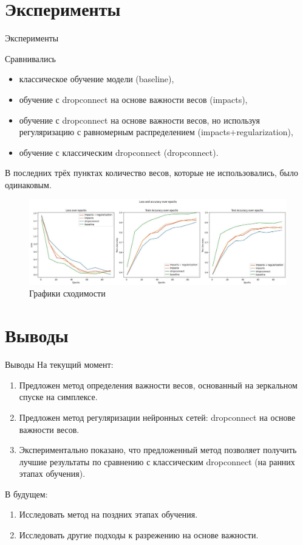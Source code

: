 \documentclass[10pt,pdf,hyperref={unicode}]{beamer}
\begin{document}
\section{Эксперименты}
\begin{frame}{Эксперименты}
\justifying

Сравнивались 
\begin{itemize}
\item классическое обучение модели (baseline), 
\item обучение с dropconnect на основе важности весов (impacts),
\item обучение с dropconnect на основе важности весов, но используя регуляризацию с равномерным распределением (impacts+regularization),
\item обучение с классическим dropconnect (dropconnect).
\end{itemize}
В последних трёх пунктах количество весов, которые не использовались, было одинаковым.

\begin{figure}[h]
\centering
\includegraphics[width=1\textwidth]{../figures/exp.png}
\caption{Графики сходимости}
\end{figure}

\end{frame}

\section{Выводы}
\begin{frame}{Выводы}
\justifying
На текущий момент:
	\begin{enumerate}
	\justifying
        \item Предложен метод определения важности весов, основанный на зеркальном спуске на симплексе.
        \item Предложен метод регуляризации нейронных сетей: dropconnect на основе важности весов.
        \item Экспериментально показано, что предложенный метод позволяет получить лучшие результаты по сравнению с классическим dropconnect (на ранних этапах обучения).
	\end{enumerate}

\bigskip

В будущем:
\begin{enumerate}
\item Исследовать метод на поздних этапах обучения.
\item Исследовать другие подходы к разрежению на основе важности.
\end{enumerate}
\end{frame}
\end{document}
